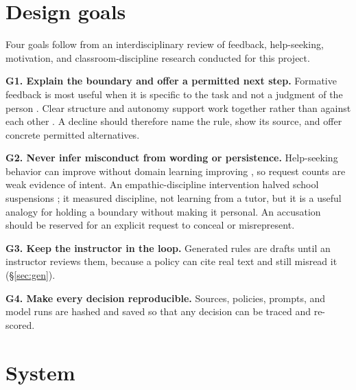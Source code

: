 \documentclass[11pt,letterpaper]{article}
\begin{document}
\section{Design goals}

Four goals follow from an interdisciplinary review of feedback, help-seeking, motivation, and classroom-discipline research conducted for this project.

\textbf{G1. Explain the boundary and offer a permitted next step.} Formative feedback is most useful when it is specific to the task and not a judgment of the person \citep{shute2008,hattie2007}. Clear structure and autonomy support work together rather than against each other \citep{jang2010}. A decline should therefore name the rule, show its source, and offer concrete permitted alternatives.

\textbf{G2. Never infer misconduct from wording or persistence.} Help-seeking behavior can improve without domain learning improving \citep{roll2011,aleven2006}, so request counts are weak evidence of intent. An empathic-discipline intervention halved school suspensions \citep{okonofua2016}; it measured discipline, not learning from a tutor, but it is a useful analogy for holding a boundary without making it personal. An accusation should be reserved for an explicit request to conceal or misrepresent.

\textbf{G3. Keep the instructor in the loop.} Generated rules are drafts until an instructor reviews them, because a policy can cite real text and still misread it (\S\ref{sec:gen}).

\textbf{G4. Make every decision reproducible.} Sources, policies, prompts, and model runs are hashed and saved so that any decision can be traced and re-scored.

\section{System}\label{sec:system}
\end{document}
